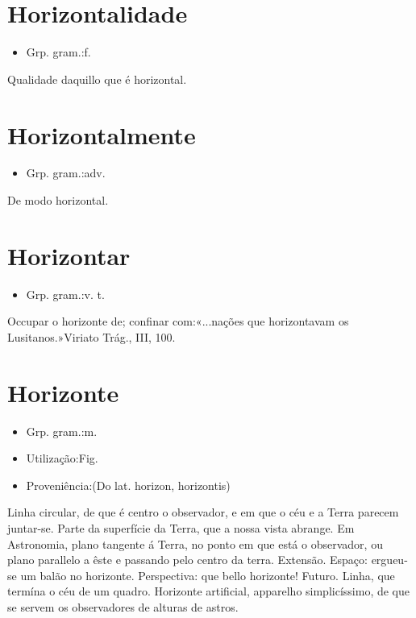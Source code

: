 \documentclass{article}
\begin{document}
\section{Horizontalidade}
\begin{itemize}
\item {Grp. gram.:f.}
\end{itemize}
Qualidade daquillo que é horizontal.
\section{Horizontalmente}
\begin{itemize}
\item {Grp. gram.:adv.}
\end{itemize}
De modo horizontal.
\section{Horizontar}
\begin{itemize}
\item {Grp. gram.:v. t.}
\end{itemize}
Occupar o horizonte de; confinar com:«\textunderscore ...nações que horizontavam os Lusitanos.\textunderscore »\textunderscore Viriato Trág.\textunderscore , III, 100.
\section{Horizonte}
\begin{itemize}
\item {Grp. gram.:m.}
\end{itemize}
\begin{itemize}
\item {Utilização:Fig.}
\end{itemize}
\begin{itemize}
\item {Proveniência:(Do lat. \textunderscore horizon\textunderscore , \textunderscore horizontis\textunderscore )}
\end{itemize}
Linha circular, de que é centro o observador, e em que o céu e a Terra parecem juntar-se.
Parte da superfície da Terra, que a nossa vista abrange.
Em Astronomia, plano tangente á Terra, no ponto em que está o observador, ou plano parallelo a êste e passando pelo centro da terra.
Extensão.
Espaço: \textunderscore ergueu-se um balão no horizonte\textunderscore .
Perspectiva: \textunderscore que bello horizonte\textunderscore !
Futuro.
Linha, que termína o céu de um quadro.
\textunderscore Horizonte artificial\textunderscore , apparelho simplicíssimo, de que se servem os observadores de alturas de astros.
\end{document}
